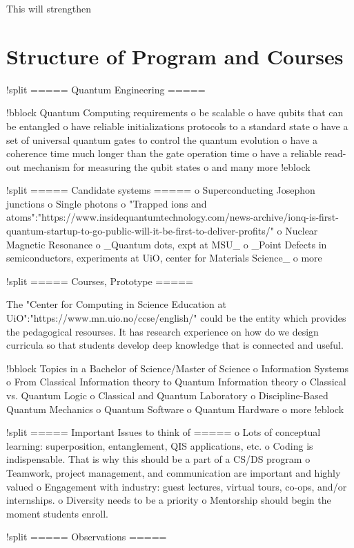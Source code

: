 \documentclass[aps,rmp,reprint,amsmath,amssymb,graphicx,longbibliography]{revtex4-1}
\begin{document}
This will strengthen 



\section{Structure of Program and Courses}

!split
===== Quantum Engineering =====

!bblock Quantum Computing requirements
o be scalable
o have qubits that can be entangled
o have reliable initializations protocols to a standard state
o have a set of universal quantum gates to control the quantum evolution
o have a coherence time much longer than the gate operation time
o have a reliable read-out mechanism for measuring the qubit states
o and many more 
!eblock

!split
===== Candidate systems =====
o Superconducting Josephon junctions
o Single photons
o "Trapped ions and atoms":"https://www.insidequantumtechnology.com/news-archive/ionq-is-first-quantum-startup-to-go-public-will-it-be-first-to-deliver-profits/"
o Nuclear Magnetic Resonance
o _Quantum dots, expt at MSU_
o _Point Defects in semiconductors, experiments at UiO, center for Materials Science_
o more


!split
===== Courses, Prototype =====

The "Center for Computing in Science Education at UiO":"https://www.mn.uio.no/ccse/english/" could be the entity which provides the pedagogical resourses. It has research experience
on how do we design curricula so that students develop deep knowledge that is connected and useful.

!bblock Topics  in a Bachelor of Science/Master of Science
o Information Systems 
o From Classical Information theory to Quantum Information theory
o Classical vs. Quantum Logic
o Classical and Quantum Laboratory 
o Discipline-Based Quantum Mechanics 
o Quantum Software
o Quantum Hardware
o more
!eblock

!split
===== Important Issues to think of =====
o Lots of conceptual learning: superposition, entanglement, QIS applications, etc.
o Coding is indispensable. That is why this should be a part of a CS/DS program
o Teamwork, project management, and communication are important and highly valued
o Engagement with industry: guest lectures, virtual tours, co-ops, and/or internships.
o Diversity needs to be a priority
o Mentorship should begin the moment students enroll.

!split
===== Observations =====
\end{document}
